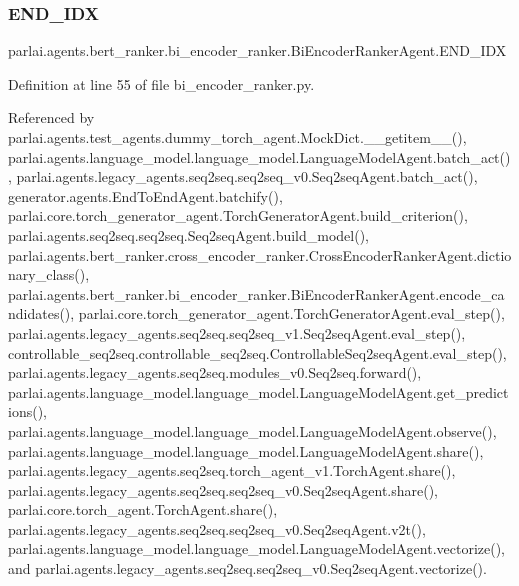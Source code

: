 \subsubsection{\texorpdfstring{E\+N\+D\+\_\+\+I\+DX}{END\_IDX}}
{\footnotesize\ttfamily parlai.\+agents.\+bert\+\_\+ranker.\+bi\+\_\+encoder\+\_\+ranker.\+Bi\+Encoder\+Ranker\+Agent.\+E\+N\+D\+\_\+\+I\+DX}



Definition at line 55 of file bi\+\_\+encoder\+\_\+ranker.\+py.



Referenced by parlai.\+agents.\+test\+\_\+agents.\+dummy\+\_\+torch\+\_\+agent.\+Mock\+Dict.\+\_\+\+\_\+getitem\+\_\+\+\_\+(), parlai.\+agents.\+language\+\_\+model.\+language\+\_\+model.\+Language\+Model\+Agent.\+batch\+\_\+act(), parlai.\+agents.\+legacy\+\_\+agents.\+seq2seq.\+seq2seq\+\_\+v0.\+Seq2seq\+Agent.\+batch\+\_\+act(), generator.\+agents.\+End\+To\+End\+Agent.\+batchify(), parlai.\+core.\+torch\+\_\+generator\+\_\+agent.\+Torch\+Generator\+Agent.\+build\+\_\+criterion(), parlai.\+agents.\+seq2seq.\+seq2seq.\+Seq2seq\+Agent.\+build\+\_\+model(), parlai.\+agents.\+bert\+\_\+ranker.\+cross\+\_\+encoder\+\_\+ranker.\+Cross\+Encoder\+Ranker\+Agent.\+dictionary\+\_\+class(), parlai.\+agents.\+bert\+\_\+ranker.\+bi\+\_\+encoder\+\_\+ranker.\+Bi\+Encoder\+Ranker\+Agent.\+encode\+\_\+candidates(), parlai.\+core.\+torch\+\_\+generator\+\_\+agent.\+Torch\+Generator\+Agent.\+eval\+\_\+step(), parlai.\+agents.\+legacy\+\_\+agents.\+seq2seq.\+seq2seq\+\_\+v1.\+Seq2seq\+Agent.\+eval\+\_\+step(), controllable\+\_\+seq2seq.\+controllable\+\_\+seq2seq.\+Controllable\+Seq2seq\+Agent.\+eval\+\_\+step(), parlai.\+agents.\+legacy\+\_\+agents.\+seq2seq.\+modules\+\_\+v0.\+Seq2seq.\+forward(), parlai.\+agents.\+language\+\_\+model.\+language\+\_\+model.\+Language\+Model\+Agent.\+get\+\_\+predictions(), parlai.\+agents.\+language\+\_\+model.\+language\+\_\+model.\+Language\+Model\+Agent.\+observe(), parlai.\+agents.\+language\+\_\+model.\+language\+\_\+model.\+Language\+Model\+Agent.\+share(), parlai.\+agents.\+legacy\+\_\+agents.\+seq2seq.\+torch\+\_\+agent\+\_\+v1.\+Torch\+Agent.\+share(), parlai.\+agents.\+legacy\+\_\+agents.\+seq2seq.\+seq2seq\+\_\+v0.\+Seq2seq\+Agent.\+share(), parlai.\+core.\+torch\+\_\+agent.\+Torch\+Agent.\+share(), parlai.\+agents.\+legacy\+\_\+agents.\+seq2seq.\+seq2seq\+\_\+v0.\+Seq2seq\+Agent.\+v2t(), parlai.\+agents.\+language\+\_\+model.\+language\+\_\+model.\+Language\+Model\+Agent.\+vectorize(), and parlai.\+agents.\+legacy\+\_\+agents.\+seq2seq.\+seq2seq\+\_\+v0.\+Seq2seq\+Agent.\+vectorize().

